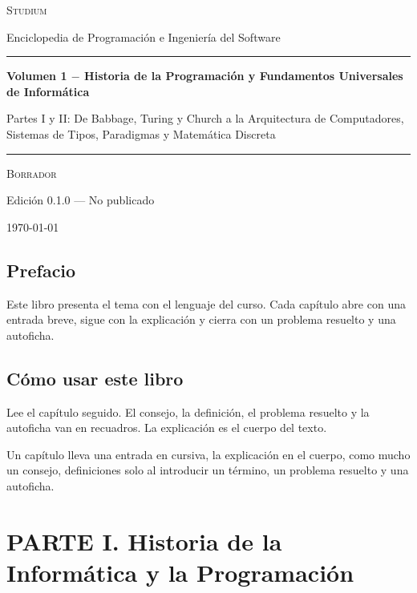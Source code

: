 \documentclass{book}
\begin{document}
\frontmatter
\thispagestyle{empty}
\setlength{\parindent}{0pt}
\vspace*{0.08\textheight}
{\normalsize\scshape\color{studiumInk} Studium\par}
{\small Enciclopedia de Programación e Ingeniería del Software\par}
\vspace{0.55em}
{\color{studiumRule}\rule{\linewidth}{0.9pt}\par}
\vspace{0.16\textheight}
{\raggedright\Huge\bfseries Volumen 1 \(-\) Historia de la Programación y Fundamentos Universales de Informática\par}
\vspace{0.9em}
{\raggedright\Large\color{studiumInk} Partes I y II: De Babbage, Turing y Church a la Arquitectura de Computadores, Sistemas de Tipos, Paradigmas y Matemática Discreta\par}
\vfill
{\color{studiumRule}\rule{0.36\linewidth}{0.45pt}\par}
\vspace{1.05em}
{\large\scshape Borrador\par}
\vspace{0.45em}
{\normalsize Edición 0.1.0 --- No publicado\par}
\vspace{0.4em}
{\normalsize\today\par}
\vspace*{0.08\textheight}
\clearpage
\chapter{Prefacio}
\noindent Este libro presenta el tema con el lenguaje del curso. Cada capítulo abre con una entrada breve, sigue con la explicación y cierra con un problema resuelto y una autoficha.
\chapter{Cómo usar este libro}
\noindent Lee el capítulo seguido. El consejo, la definición, el problema resuelto y la autoficha van en recuadros. La explicación es el cuerpo del texto.

\noindent Un capítulo lleva una entrada en cursiva, la explicación en el cuerpo, como mucho un consejo, definiciones solo al introducir un término, un problema resuelto y una autoficha.
\tableofcontents
\mainmatter

\part{PARTE I. Historia de la Informática y la Programación}
\end{document}
